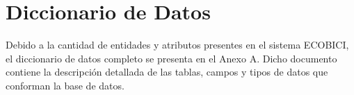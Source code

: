 \section{Diccionario de Datos}

Debido a la cantidad de entidades y atributos presentes en el sistema ECOBICI, el diccionario de datos completo se presenta en el Anexo A. Dicho documento contiene la descripción detallada de las tablas, campos y tipos de datos que conforman la base de datos.
